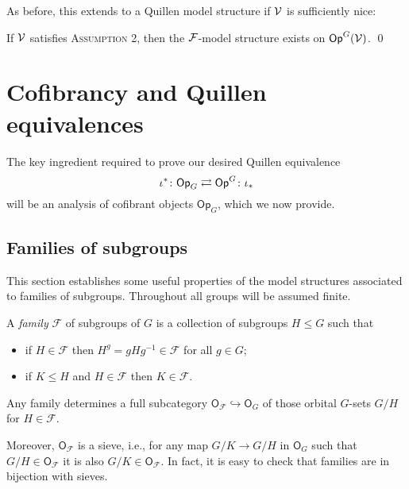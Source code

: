 \documentclass[a4paper,10pt]{article}%
\begin{document}
As before, this extends to a Quillen model structure if $\mathcal V$ is sufficiently nice:
\begin{theorem}
  If $\mathcal V$ satisfies \textsc{Assumption 2}, then the $\mathcal F$-model structure exists on $\mathsf{Op}^G(\mathcal V)$. \qed
\end{theorem}












\newpage




\section{Cofibrancy and Quillen equivalences}\label{COFIB SEC}



The key ingredient required to prove our desired Quillen equivalence
\[
	\iota^{\**} \colon
	\mathsf{Op}_G \rightleftarrows \mathsf{Op}^G
	\colon \iota_{\**}
\]
will be an analysis of cofibrant objects $\mathsf{Op}_G$, which we now provide.


\subsection{Families of subgroups}


This section establishes some useful properties of the model structures associated to families of subgroups. Throughout all groups will be assumed finite.


\begin{definition}\label{FAMILY DEF}
	A \textit{family} $\mathcal{F}$ of subgroups of $G$ is a collection of subgroups 
	$H \leq G$ such that
	\begin{itemize}
	\item if $H \in \mathcal{F}$ then 
	$H^g = gHg^{-1} \in \mathcal{F}$ for all $g \in G$;
	\item if $K \leq H$ and $H \in \mathcal{F}$ then
	$K \in \mathcal{F}$.
	\end{itemize} 
\end{definition}

\begin{remark}
	Any family determines a full subcategory 
	$\mathsf{O}_{\mathcal{F}} \hookrightarrow \mathsf{O}_G$
	of those orbital $G$-sets $G/H$ for 
	$H \in \mathcal{F}$.
	
	Moreover, $\mathsf{O}_{\mathcal{F}}$ is a sieve, i.e., for any map $G/K \to G/H$ in $\mathsf{O}_G$ such that $G/H \in \mathsf{O}_{\mathcal{F}}$ it is also $G/K \in \mathsf{O}_{\mathcal{F}}$. In fact, it is easy to check that families are in bijection with sieves.
\end{remark}
\end{document}
